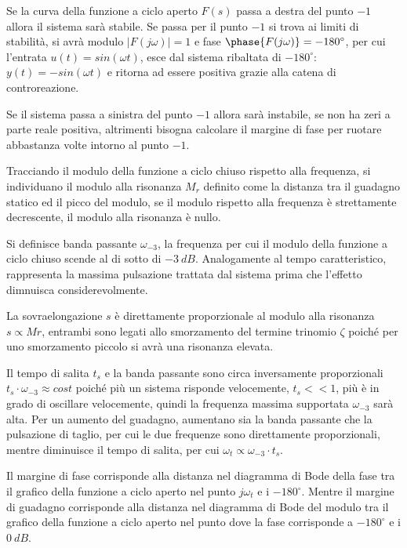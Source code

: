 \documentclass{article}
\numberwithin{equation}{subsection}
\begin{document}
Se la curva della funzione a ciclo aperto $F(s)$ passa a destra del punto $-1$ allora il sistema sarà stabile. Se passa per il punto $-1$ si trova ai limiti di 
stabilità, si avrà modulo $|F(j\omega)|=1$ e fase $\phase{F(j\omega)}=-180^{\circ}$, per cui l'entrata $u(t)=sin(\omega t)$, esce dal sistema ribaltata di $-180^{\circ}$: 
$y(t)=-sin(\omega t)$ e ritorna ad essere positiva grazie alla catena di controreazione. 

Se il sistema passa a sinistra del punto $-1$ allora sarà instabile, se non ha zeri a parte reale positiva, altrimenti bisogna calcolare il margine di fase per ruotare abbastanza 
volte intorno al punto $-1$.


Tracciando il modulo della funzione a ciclo chiuso rispetto alla frequenza, si individuano il modulo alla risonanza $M_r$ definito come la distanza tra il guadagno statico 
ed il picco del modulo, se il modulo rispetto alla frequenza è strettamente decrescente, il modulo alla risonanza è nullo. 



Si definisce banda passante $\omega_{-3}$, la 
frequenza per cui il modulo della funzione a ciclo chiuso scende al di sotto di $-3\:dB$. Analogamente al tempo caratteristico, rappresenta la massima pulsazione trattata dal 
sistema prima che l'effetto dimnuisca considerevolmente. 



La sovraelongazione $s$ è direttamente proporzionale al modulo alla risonanza $s\propto Mr$, entrambi sono legati allo smorzamento del termine trinomio $\zeta$ poiché per uno 
smorzamento piccolo si avrà una risonanza elevata.



Il tempo di salita $t_s$ e la banda passante sono circa inversamente proporzionali 
$t_s\cdot\omega_{-3}\approx cost$ poiché più un sistema risponde velocemente, $t_s<<1$, più è in grado di oscillare velocemente, quindi la frequenza massima supportata $\omega_{-3}$ 
sarà alta. 
Per un aumento del guadagno, aumentano sia la banda passante che la pulsazione di taglio, per cui le due frequenze sono direttamente proporzionali, 
mentre diminuisce il tempo di salita, per cui $\omega_t\propto\omega_{-3}\cdot t_s$.



Il margine di fase corrisponde alla distanza nel diagramma di Bode della fase tra il grafico della funzione a ciclo aperto nel punto $j\omega_t$ e i $-180^{\circ}$. 
Mentre il margine di guadagno corrisponde alla distanza nel diagramma di Bode del modulo tra il grafico della funzione a ciclo aperto nel punto dove la fase corrisponde 
a $-180^{\circ}$ e i $0\:dB$. 
\end{document}

